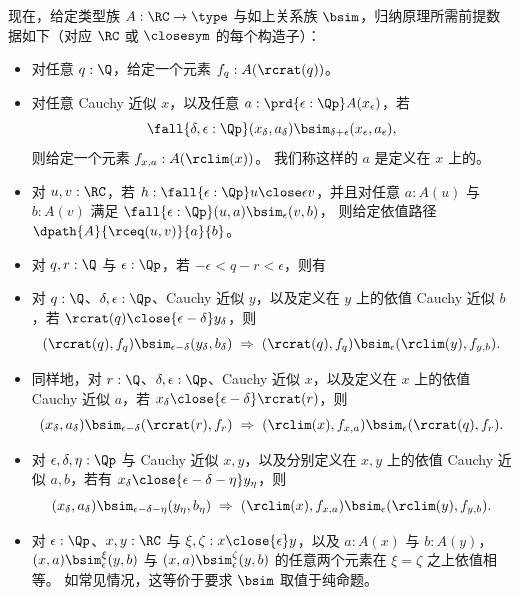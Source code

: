 %
现在，给定类型族 $A:\RC\to\type$ 与如上关系族 $\bsim$，归纳原理所需前提数据如下（对应 $\RC$ 或 $\closesym$ 的每个构造子）：
\begin{itemize}
\item 对任意 $q : \Q$，给定一个元素 $f_q:A(\rcrat(q))$。
\item 对任意 Cauchy 近似 $x$，以及任意 $a:\prd{\epsilon:\Qp} A(x_\epsilon)$，若
  \begin{equation}
    \fall{\delta, \epsilon : \Qp}
    (x_\delta,a_\delta) \bsim_{\delta+\epsilon} (x_\epsilon,a_\epsilon),
    \label{eq:depCauchyappx}
  \end{equation}
  则给定一个元素 $f_{x,a}:A(\rclim(x))$。
  我们称这样的 $a$ 是定义在 $x$ 上的。
\item 对 $u, v : \RC$，若 $h:\fall{\epsilon : \Qp} u \close\epsilon v$，并且对任意 $a:A(u)$ 与 $b:A(v)$ 满足
  $\fall{\epsilon:\Qp} (u,a) \bsim_\epsilon (v,b)$，
  则给定依值路径 $\dpath{A}{\rceq(u,v)}{a}{b}$。
\item 对 $q,r:\Q$ 与 $\epsilon:\Qp$，若 $-\epsilon < q - r < \epsilon$，则有
\item 对 $q:\Q$、$\delta,\epsilon:\Qp$、Cauchy 近似 $y$，以及定义在 $y$ 上的依值 Cauchy 近似 $b$，若 $\rcrat(q) \close{\epsilon - \delta} y_\delta$，则
  \[(\rcrat(q),f_q) \bsim_{\epsilon-\delta} (y_\delta,b_\delta)
  \;\Rightarrow\;
  (\rcrat(q),f_q) \bsim_\epsilon (\rclim(y),f_{y,b}).\]
\item 同样地，对 $r:\Q$、$\delta,\epsilon:\Qp$、Cauchy 近似 $x$，以及定义在 $x$ 上的依值 Cauchy 近似 $a$，若 $x_\delta \close{\epsilon - \delta} \rcrat(r)$，则
  \[(x_\delta,a_\delta) \bsim_{\epsilon-\delta} (\rcrat(r),f_r)
  \;\Rightarrow\;
  (\rclim(x),f_{x,a}) \bsim_\epsilon (\rcrat(q),f_r).
  \]
\item 对 $\epsilon,\delta,\eta:\Qp$ 与 Cauchy 近似 $x,y$，以及分别定义在 $x,y$ 上的依值 Cauchy 近似 $a,b$，若有 $x_\delta \close{\epsilon - \delta - \eta} y_\eta$，则
  \[ (x_\delta,a_\delta) \bsim_{\epsilon - \delta - \eta} (y_\eta,b_\eta)
  \;\Rightarrow\;
  (\rclim(x),f_{x,a}) \bsim_\epsilon (\rclim(y),f_{y,b}).\]
\item 对 $\epsilon:\Qp$、$x,y:\RC$ 与 $\xi,\zeta:x\close{\epsilon} y$，以及 $a:A(x)$ 与 $b:A(y)$，$(x,a) \bsim_\epsilon^\xi (y,b)$ 与 $(x,a) \bsim_\epsilon^\zeta (y,b)$ 的任意两个元素在 $\xi=\zeta$ 之上依值相等。
  如常见情况，这等价于要求 $\bsim$ 取值于纯命题。
\end{itemize}

